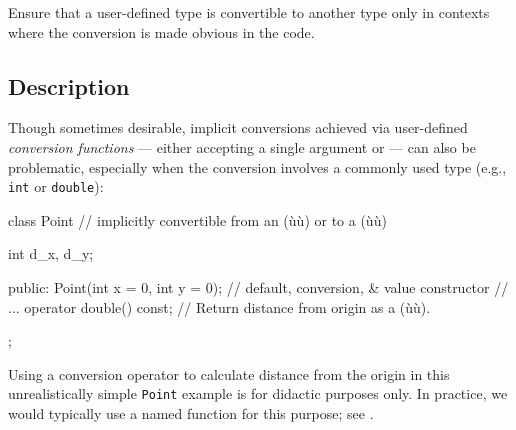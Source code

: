 
\setcounter{table}{0}
\setcounter{footnote}{0}
\setcounter{lstlisting}{0}

Ensure that a user-defined type is convertible to another type only in
contexts where the conversion is made obvious in the code.

\subsection[Description]{Description}\label{description-explicitconv}

Though sometimes desirable, implicit conversions achieved via user-defined \emph{conversion
functions} --- either  accepting a
single argument or  --- can also be problematic, especially when the
conversion involves a commonly used type (e.g., \lstinline!int! or
\lstinline!double!):

\begin{emcppslisting}[emcppsbatch=e1]
class Point  // implicitly convertible from an (ù{}ù) or to a (ù{}ù)
{
    int d_x, d_y;

public:
    Point(int x = 0, int y = 0);  // default, conversion, & value constructor
    // ...
    operator double() const;  // Return distance from origin as a (ù{}ù).
};
\end{emcppslisting}

\noindent Using a conversion operator to
calculate distance from the origin in this unrealistically simple \lstinline!Point!
example is for didactic purposes only. In practice, we would typically
use a named function for this purpose; see .

